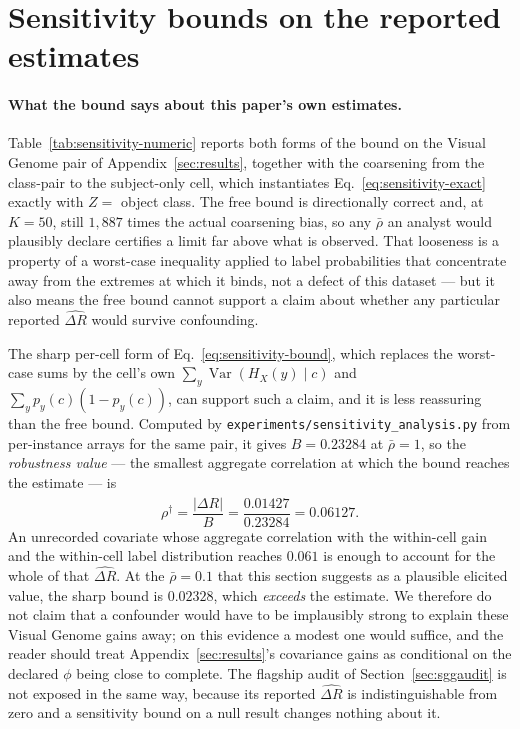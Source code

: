 \section{Sensitivity bounds on the reported estimates}\label{app:sensitivity}

\paragraph{What the bound says about this paper's own estimates.}
Table~\ref{tab:sensitivity-numeric} reports both forms of the bound on the Visual Genome
pair of Appendix~\ref{sec:results}, together with the coarsening from the class-pair to
the subject-only cell, which instantiates Eq.~\eqref{eq:sensitivity-exact} exactly with
$Z=$ object class. The free bound is directionally correct and, at $K=50$, still
$1{,}887$ times the actual coarsening bias, so any $\bar\rho$ an analyst would plausibly
declare certifies a limit far above what is observed. That looseness is a property of a
worst-case inequality applied to label probabilities that concentrate away from the
extremes at which it binds, not a defect of this dataset --- but it also means the free
bound cannot support a claim about whether any particular reported $\widehat{\Delta R}$
would survive confounding.

The sharp per-cell form of Eq.~\eqref{eq:sensitivity-bound}, which replaces the
worst-case sums by the cell's own $\sum_y\operatorname{Var}(H_X(y)\mid c)$ and
$\sum_yp_y(c)(1-p_y(c))$, can support such a claim, and it is less reassuring than the
free bound. Computed by \texttt{experiments/sensitivity\_analysis.py} from per-instance
arrays for the same pair, it gives $B=0.23284$ at $\bar\rho=1$, so the
\emph{robustness value} --- the smallest aggregate correlation at which the bound reaches
the estimate --- is
\begin{equation}
\rho^\dagger=\frac{\bigl|\widehat{\Delta R}\bigr|}{B}
=\frac{0.01427}{0.23284}=0.06127 .
\label{eq:robustness-value}
\end{equation}
An unrecorded covariate whose aggregate correlation with the within-cell gain and the
within-cell label distribution reaches $0.061$ is enough to account for the whole of that
$\widehat{\Delta R}$. At the $\bar\rho=0.1$ that this section suggests as a plausible
elicited value, the sharp bound is $0.02328$, which \emph{exceeds} the estimate. We
therefore do not claim that a confounder would have to be implausibly strong to explain
these Visual Genome gains away; on this evidence a modest one would suffice, and the
reader should treat Appendix~\ref{sec:results}'s covariance gains as conditional on the
declared $\phi$ being close to complete. The flagship audit of
Section~\ref{sec:sggaudit} is not exposed in the same way, because its reported
$\widehat{\Delta R}$ is indistinguishable from zero and a sensitivity bound on a null
result changes nothing about it.

